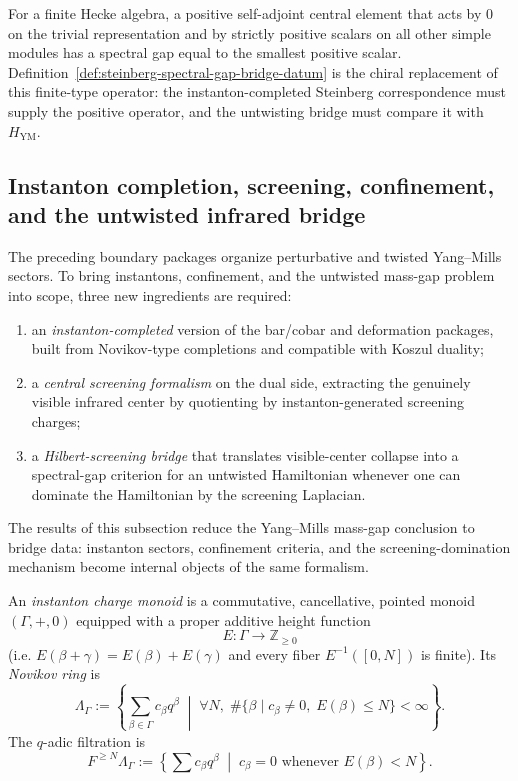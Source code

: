 \begin{remark}
\label{rem:steinberg-mass-gap-bridge}
For a finite Hecke algebra, a positive self-adjoint central element that acts by $0$ on the trivial
representation and by strictly positive scalars on all other simple modules has a spectral gap equal to
the smallest positive scalar.
Definition~\ref{def:steinberg-spectral-gap-bridge-datum} is the chiral replacement of this finite-type
operator: the instanton-completed Steinberg correspondence must supply the positive operator,
and the untwisting bridge must compare it with $H_{\mathrm{YM}}$.
\end{remark}

\subsection{Instanton completion, screening, confinement, and the untwisted infrared bridge}
\label{subsec:instanton-screening-ir-bridge}

\begin{summary}
The preceding boundary packages organize perturbative and twisted Yang--Mills sectors.
To bring instantons, confinement, and the untwisted mass-gap problem into scope, three
new ingredients are required:
\begin{enumerate}[label=(\roman*)]
\item an \emph{instanton-completed} version of the bar/cobar and deformation packages, built from
Novikov-type completions and compatible with Koszul duality;
\item a \emph{central screening formalism} on the dual side, extracting the genuinely visible
infrared center by quotienting by instanton-generated screening charges;
\item a \emph{Hilbert-screening bridge} that translates visible-center collapse into a spectral-gap
criterion for an untwisted Hamiltonian whenever one can dominate the Hamiltonian by the screening
Laplacian.
\end{enumerate}
The results of this subsection reduce the Yang--Mills mass-gap conclusion to bridge data:
instanton sectors, confinement criteria, and the screening-domination mechanism become internal
objects of the same formalism.
\end{summary}

\begin{definition}
\label{def:instanton-charge-monoid}
An \emph{instanton charge monoid} is a commutative, cancellative, pointed monoid
$(\Gamma,+,0)$ equipped with a proper additive height function
\[
E\colon \Gamma \longrightarrow \mathbb Z_{\ge 0}
\]
(i.e. $E(\beta+\gamma)=E(\beta)+E(\gamma)$ and every fiber $E^{-1}([0,N])$ is finite).
Its \emph{Novikov ring} is
\[
\Lambda_{\Gamma}
:=
\left\{\sum_{\beta\in\Gamma} c_{\beta} q^{\beta}
\;\middle|\;
\forall N,\; \#\{\beta\mid c_{\beta}\neq 0,\;E(\beta)\le N\}<\infty
\right\}.
\]
The $q$-adic filtration is
\[
F^{\ge N}\Lambda_{\Gamma}
:=
\left\{\sum c_{\beta}q^{\beta}\;\middle|\; c_{\beta}=0\text{ whenever }E(\beta)<N\right\}.
\]
\end{definition}

